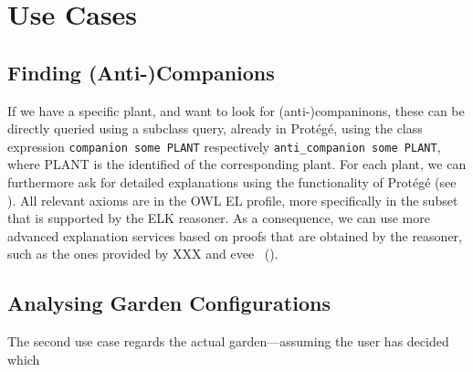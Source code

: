 \section{Use Cases}

\subsection{Finding (Anti-)Companions}

If we have a specific plant, and want to look for (anti-)companinons, these can be
directly queried using a subclass query, already in Prot\'eg\'e, using the class expression
\verb|companion some PLANT| respectively \verb|anti_companion some PLANT|, where PLANT is
the identified of the corresponding plant. For each plant, we can furthermore ask for detailed
explanations using the functionality of Prot\'eg\'e (see ).
All relevant axioms are in the OWL EL profile, more
specifically in the subset that is supported by the ELK reasoner\cite{ELK}. As a consequence,
we can use more advanced explanation services based on proofs that are obtained by the \ELK
reasoner, such as the ones provided by XXX and evee~\cite{evee} ().

\subsection{Analysing Garden Configurations}

The second use case regards the actual garden---assuming the user has decided which
